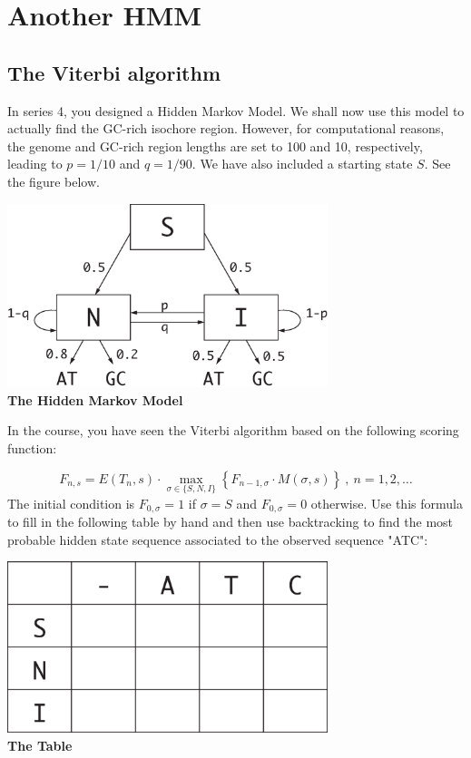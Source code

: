 \documentclass[a4paper,11pt]{article}
\begin{document}
\section{Another HMM}

\subsection{The Viterbi algorithm}

In series 4, you designed a Hidden Markov Model. We shall now use this model to actually find the GC-rich isochore region. However, for computational reasons, the genome and GC-rich region lengths are set to 100 and 10, respectively, leading to $p=1/10$ and $q=1/90$. We have also included a starting state $S$. See the figure below.


\begin{center}
\includegraphics[width=0.7\textwidth]{fig1.eps}\\
\vspace{0.5cm}
{\bf The Hidden Markov Model}
\end{center}

In the course, you have seen the Viterbi algorithm based on the following scoring function:

$$
F_{n,s} = E(T_n, s) \cdot \max_{\sigma \in \{S, N, I\}}\left\{F_{n-1, \sigma} \cdot M(\sigma, s)  \right\}~, \ n = 1, 2, \dots
$$
The initial condition is $F_{0, \sigma} = 1$ if $\sigma = S$ and $F_{0, \sigma} = 0$ otherwise. Use this formula to fill in the following table by hand and then use backtracking to find the most probable hidden state sequence associated to the observed sequence "ATC":

\begin{center}
\includegraphics[width=0.7\textwidth]{fig2.eps}\\
\vspace{0.5cm}
{\bf The Table}
\end{center}
\end{document}
